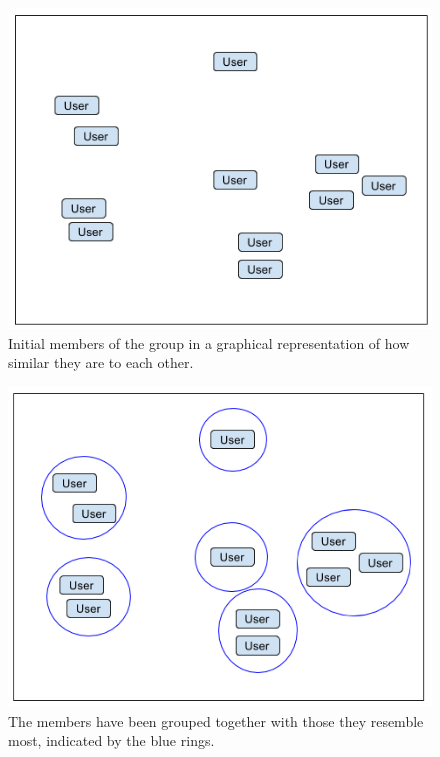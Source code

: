 \begin{figure}[H]
	\centering
	\includegraphics[scale=0.6]{graphics/Clustering_1.png}
	\caption{Initial members of the group in a graphical representation of how similar they are to each other.}
	\label{fig:bg:clustering_1}
\end{figure}

\begin{figure}[H]
	\centering
	\includegraphics[scale=0.6]{graphics/Clustering_2.png}
	\caption{The members have been grouped together with those they resemble most, indicated by the blue rings.}
	\label{fig:bg:clustering_2}
\end{figure}

